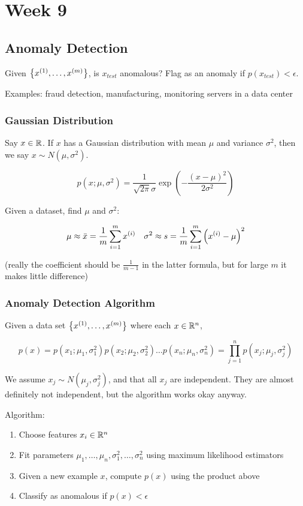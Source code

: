 \chapter{Week 9}

\section{Anomaly Detection}

Given $\qty{x_{}^{(1)}, \dots, x_{}^{(m)}}$, is $x_{test}$ anomalous?
Flag as an anomaly if $p(x_{test}) < \epsilon$.

Examples: fraud detection, manufacturing, monitoring servers in a data center

\subsection{Gaussian Distribution}

Say $x \in \mathbb{R}$.  If $x$ has a Gaussian distribution with mean $\mu$
and variance $\sigma^2$, then we say $x \sim N(\mu,\sigma^2)$.

\[ 
    p(x; \mu, \sigma^2) = 
    \frac{1}{\sqrt{2\pi} \sigma} 
    \exp(-\frac{(x-\mu)^2}{2\sigma^2}) 
\]

Given a dataset, find $\mu$ and $\sigma^2$:

\[
    \mu \approx \bar{x} = \frac{1}{m} \sum_{i=1}^m x_{}^{(i)}
    \quad
    \sigma^2 \approx s = \frac{1}{m} \sum_{i=1}^m \qty(x_{}^{(i)}-\mu)^2
\]

(really the coefficient should be $\frac{1}{m-1}$ in the latter formula,
but for large $m$ it makes little difference)

\subsection{Anomaly Detection Algorithm}

Given a data set $\qty{x_{}^{(1)}, \dots, x_{}^{(m)}}$ where each $x \in \mathbb{R}^n$,

\[
    p(x)
    = p(x_1; \mu_1, \sigma_1^2)
      p(x_2; \mu_2, \sigma_2^2) \dots 
      p(x_n; \mu_n, \sigma_n^2)
    = \prod_{j=1}^n p(x_j; \mu_j, \sigma_j^2)
\]

We assume $x_j \sim N(\mu_j, \sigma_j^2)$,
and that all $x_j$ are independent.
They are almost definitely not independent, but the algorithm works okay anyway.

Algorithm:
\begin{enumerate}
    \item Choose features $x_i \in \mathbb{R}^n$
    \item Fit parameters $\mu_1, \dots, \mu_n, \sigma_1^2, \dots, \sigma_n^2$
        using maximum likelihood estimators
    \item Given a new example $x$, compute $p(x)$ using the product above
    \item Classify as anomalous if $p(x) < \epsilon$
\end{enumerate}

